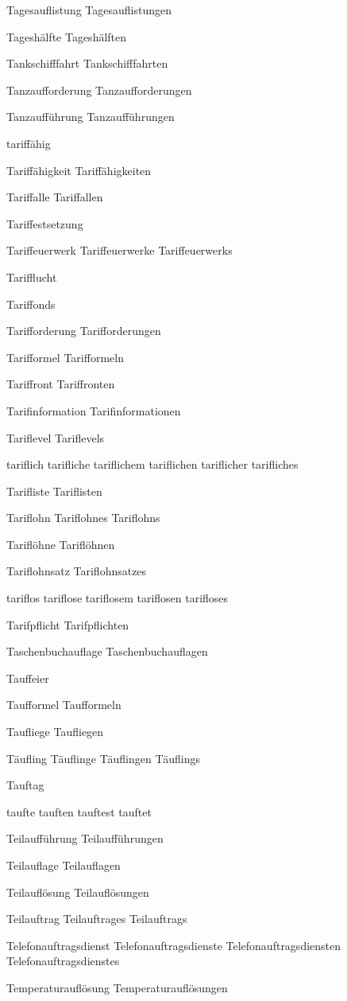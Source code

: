 Tagesauflistung
Tagesauflistungen

Tageshälfte
Tageshälften

Tankschifffahrt
Tankschifffahrten

Tanzaufforderung
Tanzaufforderungen

Tanzaufführung
Tanzaufführungen

tariffähig

Tariffähigkeit
Tariffähigkeiten

Tariffalle
Tariffallen

Tariffestsetzung

Tariffeuerwerk
Tariffeuerwerke
Tariffeuerwerks

Tarifflucht

Tariffonds

Tarifforderung
Tarifforderungen

Tarifformel
Tarifformeln

Tariffront 
Tariffronten

Tarifinformation
Tarifinformationen

Tariflevel
Tariflevels

tariflich
tarifliche
tariflichem
tariflichen
tariflicher
tarifliches

Tarifliste
Tariflisten

Tariflohn
Tariflohnes
Tariflohns

Tariflöhne
Tariflöhnen

Tariflohnsatz
Tariflohnsatzes

tariflos
tariflose
tariflosem
tariflosen
tarifloses

Tarifpflicht
Tarifpflichten

Taschenbuchauflage
Taschenbuchauflagen

Tauffeier

Taufformel
Taufformeln

Taufliege
Taufliegen

Täufling
Täuflinge
Täuflingen
Täuflings

Tauftag

taufte
tauften
tauftest
tauftet

Teilaufführung
Teilaufführungen

Teilauflage
Teilauflagen

Teilauflösung
Teilauflösungen

Teilauftrag
Teilauftrages
Teilauftrags

Telefonauftragsdienst
Telefonauftragsdienste
Telefonauftragsdiensten
Telefonauftragsdienstes

Temperaturauflösung
Temperaturauflösungen

